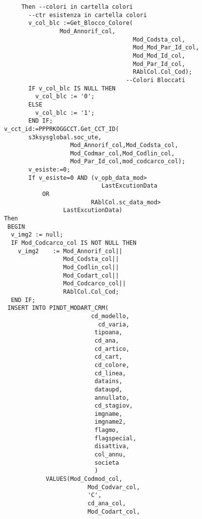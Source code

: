\begin{lstlisting}
            Then --colori in cartella colori
              --ctr esistenza in cartella colori
              v_col_blc :=Get_Blocco_Colore(
			           Mod_Annorif_col,
                                            Mod_Codsta_col,
                                            Mod_Mod_Par_Id_col,
                                            Mod_Mod_Id_col,
                                            Mod_Par_Id_col,
                                            RAblCol.Col_Cod); 
                                          --Colori Bloccati
              IF v_col_blc IS NULL THEN
                v_col_blc := '0';
              ELSE
                v_col_blc := '1';
              END IF;
	   v_cct_id:=PPPRKOGGCCT.Get_CCT_ID(
		      s3ksysglobal.soc_ute,
                          Mod_Annorif_col,Mod_Codsta_col,
                          Mod_Codmar_col,Mod_Codlin_col,
                          Mod_Par_Id_col,mod_codcarco_col);
              v_esiste:=0;
              If v_esiste=0 AND (v_opb_data_mod>
                                   LastExcutionData 
				  OR
                                RAblCol.sc_data_mod>
			            LastExcutionData) 
       Then 
        BEGIN
         v_img2 := null;
         IF Mod_Codcarco_col IS NOT NULL THEN
           v_img2    := Mod_Annorif_col||
                        Mod_Codsta_col||
                        Mod_Codlin_col||
                        Mod_Codart_col||
                        Mod_Codcarco_col||
                        RAblCol.Col_Cod;
         END IF;
        INSERT INTO PINDT_MODART_CRM(
	                            cd_modello,
                                  cd_varia,
                                 tipoana,
                                 cd_ana,
                                 cd_artico,
                                 cd_cart,
                                 cd_colore,
                                 cd_linea,
                                 datains,
                                 dataupd,
                                 annullato,
                                 cd_stagiov,
                                 imgname,
                                 imgname2,
                                 flagmo,
                                 flagspecial,
                                 disattiva,
                                 col_annu,
                                 societa
                                 )
                   VALUES(Mod_Codmod_col,
                               Mod_Codvar_col,
                               'C',
                               cd_ana_col,
                               Mod_Codart_col,

\end{lstlisting}
